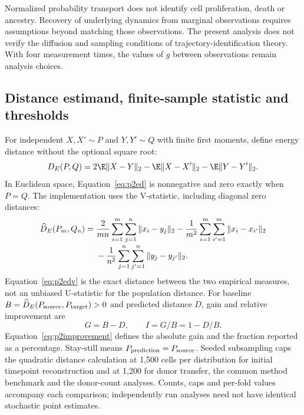 Normalized probability transport does not identify cell proliferation, death or ancestry. Recovery of underlying dynamics from marginal observations requires assumptions beyond matching those observations. The present analysis does not verify the diffusion and sampling conditions of trajectory-identification theory. With four measurement times, the values of $g$ between observations remain analysis choices.

\subsection{Distance estimand, finite-sample statistic and thresholds}
For independent $X,X'\sim P$ and $Y,Y'\sim Q$ with finite first moments, define energy distance without the optional square root:
\begin{equation}
D_E(P,Q)=2\E\|X-Y\|_2-\E\|X-X'\|_2-\E\|Y-Y'\|_2.\label{eq:p2ed}
\end{equation}
In Euclidean space, Equation~\eqref{eq:p2ed} is nonnegative and zero exactly when $P=Q$. The implementation uses the V-statistic, including diagonal zero distances:
\begin{align}
\widehat D_E(P_m,Q_n)={}&\frac{2}{mn}\sum_{i=1}^{m}\sum_{j=1}^{n}\|x_i-y_j\|_2
-\frac1{m^2}\sum_{i=1}^{m}\sum_{i'=1}^{m}\|x_i-x_{i'}\|_2\notag\\[-2pt]
&-\frac1{n^2}\sum_{j=1}^{n}\sum_{j'=1}^{n}\|y_j-y_{j'}\|_2.\label{eq:p2edv}
\end{align}
Equation~\eqref{eq:p2edv} is the exact distance between the two empirical measures, not an unbiased U-statistic for the population distance. For baseline $B=\widehat D_E(P_{\rm source},P_{\rm target})>0$ and predicted distance $D$, gain and relative improvement are
\begin{equation}
G=B-D,\qquad I=G/B=1-D/B.\label{eq:p2improvement}
\end{equation}
Equation~\eqref{eq:p2improvement} defines the absolute gain and the fraction reported as a percentage. Stay-still means $P_{\rm prediction}=P_{\rm source}$. Seeded subsampling caps the quadratic distance calculation at 1,500 cells per distribution for initial timepoint reconstruction and at 1,200 for donor transfer, the common method benchmark and the donor-count analyses. Counts, caps and per-fold values accompany each comparison; independently run analyses need not have identical stochastic point estimates.

